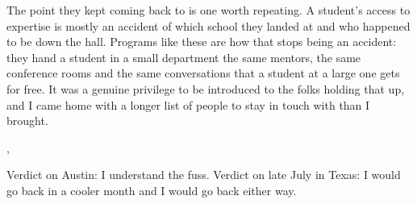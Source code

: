 
The point they kept coming back to is one worth repeating. A student's access to
expertise is mostly an accident of which school they landed at and who happened
to be down the hall. Programs like these are how that stops being an accident:
they hand a student in a small department the same mentors, the same conference
rooms and the same conversations that a student at a large one gets for free. It
was a genuine privilege to be introduced to the folks holding that up, and I
came home with a longer list of people to stay in touch with than I brought.

\sep

Verdict on Austin: I understand the fuss. Verdict on late July in Texas: I would
go back in a cooler month and I would go back either way.


